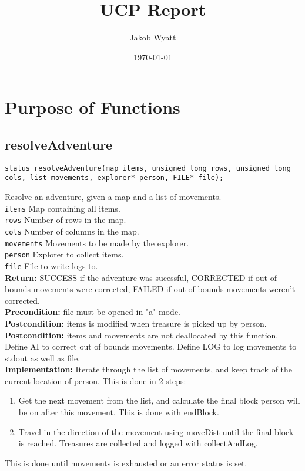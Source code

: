 \documentclass{article}
\title{UCP Report}
\date{\today}
\author{Jakob Wyatt}
\begin{document}
\maketitle
\pagebreak
\tableofcontents
\pagebreak

\section{Purpose of Functions}

\subsection{resolveAdventure}
\begin{lstlisting}
status resolveAdventure(map items, unsigned long rows, unsigned long cols, list movements, explorer* person, FILE* file);
\end{lstlisting}


 Resolve an adventure, given a map and a list of movements.\\ 
 \texttt{items} Map containing all items.\\ 
 \texttt{rows} Number of rows in the map.\\ 
 \texttt{cols} Number of columns in the map.\\ 
 \texttt{movements} Movements to be made by the explorer.\\ 
 \texttt{person} Explorer to collect items.\\ 
 \texttt{file} File to write logs to.\\ 
 \textbf{Return:} SUCCESS if the adventure was sucessful,
         CORRECTED if out of bounds movements were corrected,
         FAILED if out of bounds movements weren't corrected.\\ 
 \textbf{Precondition:}  file must be opened in "a" mode.\\ 
 \textbf{Postcondition:}  items is modified when  treasure is picked up by  person.\\ 
 \textbf{Postcondition:}  items and  movements are not deallocated by this function.
 Define AI to correct out of bounds movements.
         Define LOG to log movements to stdout as well as  file.\\
 \textbf{Implementation:}
Iterate through the list of movements, and keep track of the current location of  person.
This is done in 2 steps:
    \begin{enumerate}
     \item Get the next movement from the list, and calculate the final block  person will be on after this movement.
         This is done with  endBlock.
     \item Travel in the direction of the movement using  moveDist until the final block is reached.
         Treasures are collected and logged with  collectAndLog. 
    \end{enumerate}
 This is done until  movements is exhausted or an error status is set.
\end{document}
